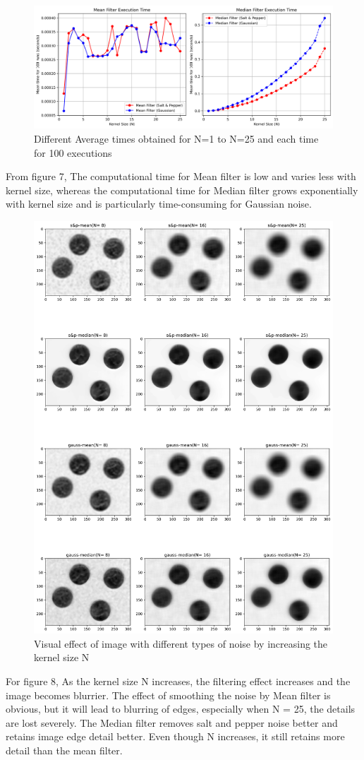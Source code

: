 \documentclass[12pt]{article}
\begin{document}
    \begin{figure}[ht]
        \centering
            \includegraphics[width=1\columnwidth, keepaspectratio]{pics/a2-3.1-2}
        \caption[]{Different Average times obtained for N=1 to N=25 and each time for 100 executions}
        \label{fig:3.2}
        \end{figure}
        From figure 7, The computational time for Mean filter is low and varies less with kernel size, whereas the computational time for Median filter grows exponentially with kernel size and is particularly time-consuming for Gaussian noise. 
    \begin{figure}[ht]
        \centering
            \includegraphics[width=0.5\columnwidth, keepaspectratio]{pics/a2-3.1-3}
        \caption[]{Visual effect of image with different types of noise by increasing the kernel size N }
        \label{fig:3.3}
    \end{figure}
    
    
    For figure 8, As the kernel size N increases, the filtering effect increases and the image becomes blurrier. The effect of smoothing the noise by Mean filter is obvious, but it will lead to blurring of edges, especially when 
    N = 25, the details are lost severely. The Median filter removes salt and pepper noise better and retains image edge detail better. Even though N increases, it still retains more detail than the mean filter.
\end{document}
